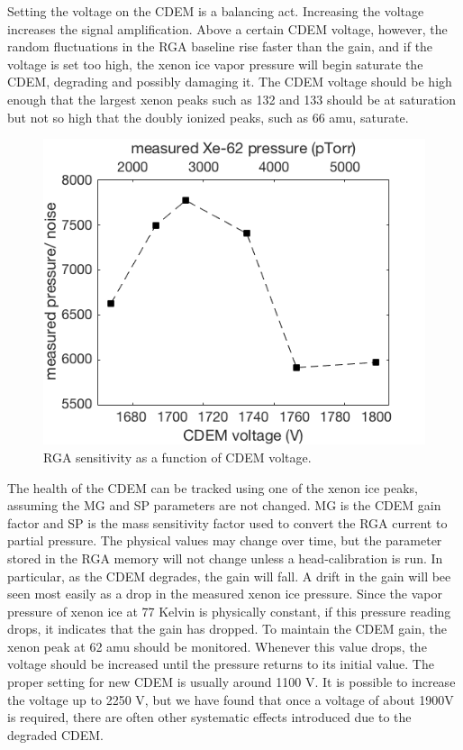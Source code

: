 Setting the voltage on the CDEM is a balancing act. Increasing the voltage increases the signal amplification. Above a certain CDEM voltage, however, the random fluctuations in the RGA baseline rise faster than the gain, and if the voltage is set too high, the xenon ice vapor pressure will begin saturate the CDEM, degrading and possibly damaging it. The CDEM voltage should be high enough that the largest xenon peaks such as 132 and 133 should be at saturation but not so high that the doubly ionized peaks, such as 66 amu, saturate.
\begin{figure}[h]
  \includegraphics[width=\linewidth]{Figures/CDEM_gain_noise.png}
  \caption{RGA sensitivity as a function of CDEM voltage. }
  \label{fig:CTpid}
\end{figure}

The health of the CDEM can be tracked using one of the xenon ice peaks, assuming the MG and SP parameters are not changed. MG is the CDEM gain factor and SP is the mass sensitivity factor used to convert the RGA current to partial pressure. The physical values may change over time, but the parameter stored in the RGA memory will not change unless a head-calibration is run. In particular, as the CDEM degrades, the gain will fall. A drift in the gain will bee seen most easily as a drop in the measured xenon ice pressure. Since the vapor pressure of xenon ice at 77 Kelvin is physically constant, if this pressure reading drops, it indicates that the gain has dropped. To maintain the CDEM gain, the xenon peak at 62 amu should be monitored. Whenever this value drops, the voltage should be increased until the pressure returns to its initial value. The proper setting for new CDEM is usually around 1100 V. It is possible to increase the voltage up to 2250 V, but we have found that once a voltage of about 1900V is required, there are often other systematic effects introduced due to the degraded CDEM. 


